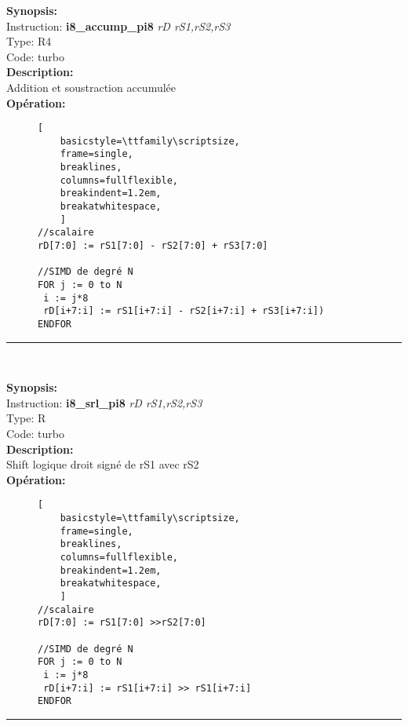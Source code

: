{\scriptsize
\textbf{Synopsis:}\\
Instruction: \textbf{i8\_accump\_pi8 } \textit{rD rS1,rS2,rS3}\\
Type: R4\\
Code: turbo\\
\textbf{Description:}\\
Addition et soustraction accumulée\\
\textbf{Opération:}\\
    \begin{figure}[H]
    \begin{lstlisting}[
    basicstyle=\ttfamily\scriptsize,
    frame=single,
    breaklines,
    columns=fullflexible,
    breakindent=1.2em,
    breakatwhitespace,
    ]
//scalaire
rD[7:0] := rS1[7:0] - rS2[7:0] + rS3[7:0]
    
//SIMD de degré N
FOR j := 0 to N    
 i := j*8    
 rD[i+7:i] := rS1[i+7:i] - rS2[i+7:i] + rS3[i+7:i]) 
ENDFOR
\end{lstlisting}
\end{figure}
}
\rule{8cm}{0.4pt}\\
{\scriptsize
\textbf{Synopsis:}\\
Instruction: \textbf{i8\_srl\_pi8  } \textit{rD rS1,rS2,rS3}\\
Type: R\\
Code: turbo\\
\textbf{Description:}\\
Shift logique droit signé de rS1 avec rS2 \\
\textbf{Opération:}\\
    \begin{figure}[H]
    \begin{lstlisting}[
    basicstyle=\ttfamily\scriptsize,
    frame=single,
    breaklines,
    columns=fullflexible,
    breakindent=1.2em,
    breakatwhitespace,
    ]
//scalaire
rD[7:0] := rS1[7:0] >>rS2[7:0] 
    
//SIMD de degré N
FOR j := 0 to N    
 i := j*8    
 rD[i+7:i] := rS1[i+7:i] >> rS1[i+7:i] 
ENDFOR
\end{lstlisting}
\end{figure}
}
\rule{8cm}{0.4pt}\\
